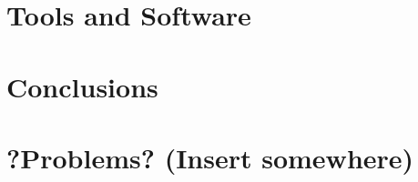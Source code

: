 \documentclass{beamer}
\begin{document}
\section{Tools and Software}

\section{Conclusions}

\section{?Problems? (Insert somewhere)}

\end{document}
